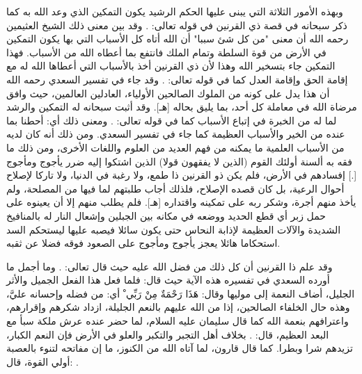 وبهذه الأمور الثلاثة التي يبنى عليها الحكم الرشيد يكون التمكين الذي وعد الله به كما ذكر سبحانه في قصة ذي القرنين في قوله تعالى: 
\quranayah*[18][84-85]{\footnotesize \surahname*[18]}. وقد بين معنى ذلك الشيخ العثيمين رحمه الله أن معنى "من كل شئ سببا" أن الله أتاه كل الأسباب التي بها يكون التمكين في الأرض من قوة السلطة وتمام الملك فانتفع بما أعطاه الله من الأسباب. فهذا التمكين جاء بتسخير الله وهذا لأن ذي القرنين أخذ بالأسباب التي أعطاها الله له مع إقامة الحق وإقامة العدل كما في قوله تعالى: 
\quranayah*[18][87-89]{\footnotesize \surahname*[18]}. وقد جاء في تفسير السعدي رحمه الله أن هذا يدل على كونه من الملوك الصالحين الأولياء، العادلين العالمين، حيث وافق مرضاة الله في معاملة كل أحد، بما يليق بحاله [هـ]. وقد أثبت  سبحانه له التمكين والرشد لما له من الخبرة في إتباع الأسباب كما في قوله تعالى: 
\quranayah*[18][91-92]{\footnotesize \surahname*[18]}. ومعنى ذلك أي: أحطنا بما عنده من الخير والأسباب العظيمة كما جاء في تفسير السعدي. ومن ذلك أنه كان لديه من الأسباب العلمية ما يمكنه من فهم العديد من العلوم واللغات الأخرى، ومن ذلك ما فقه به ألسنة أولئك القوم (الذين لا يفقهون قولا) الذين اشتكوا إليه ضرر يأجوج ومأجوج [.] إفسادهم في الأرض، فلم يكن ذو القرنين ذا طمع، ولا رغبة في الدنيا، ولا تاركا لإصلاح أحوال الرعية، بل كان قصده الإصلاح، فلذلك أجاب طلبتهم لما فيها من المصلحة، ولم يأخذ منهم أجرة، وشكر ربه على تمكينه واقتداره [هـ]. فلم يطلب منهم إلا أن يعينوه على حمل زبر أي قطع الحديد ووضعه في مكانه بين الجبلين وإشعال النار له بالمنافيخ الشديدة والآلات العظيمة لإذابة النحاس حتى يكون سائلا فيصبه عليها ليستحكم السد استحكاما هائلا يعجز يأجوج ومأجوج على الصعود فوقه فضلا عن ثقبه. 

وقد علم ذا القرنين أن كل ذلك من فضل الله عليه حيث قال تعالى: 
\quranayah*[18][98]{\footnotesize \surahname*[18]}. وما أجمل ما أورده السعدي في تفسيره هذه الآية حيث قال: 
فلما فعل هذا الفعل الجميل والأثر الجليل، أضاف النعمة إلى موليها وقال: { هَذَا رَحْمَةٌ مِنْ رَبِّي ْ} أي: من فضله وإحسانه عليَّ، وهذه حال الخلفاء الصالحين، إذا من الله عليهم بالنعم الجليلة، ازداد شكرهم وإقرارهم، واعترافهم بنعمة الله كما قال سليمان عليه السلام، لما حضر عنده عرش ملكة سبأ مع البعد العظيم، قال: 
\quranayah*[27][40][19]{\footnotesize \surahname*[27]}.
بخلاف أهل التجبر والتكبر والعلو في الأرض فإن النعم الكبار، تزيدهم شرا وبطرا. كما قال قارون، لما آتاه الله من الكنوز، ما إن مفاتحه لتنوء بالعصبة أولي القوة، قال: 
\quranayah*[28][78][1-6]{\footnotesize \surahname*[28]}. 

